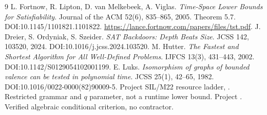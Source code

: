 \documentclass[10pt]{article}
\begin{document}
\begin{thebibliography}{9}
 L. Fortnow, R. Lipton, D. van Melkebeek, A. Viglas. \emph{Time-Space Lower Bounds for Satisfiability}. Journal of the ACM 52(6), 835--865, 2005. Theorem 5.7. DOI:10.1145/1101821.1101822. \url{https://lance.fortnow.com/papers/files/tst.pdf}.
 J. Dreier, S. Ordyniak, S. Szeider. \emph{SAT Backdoors: Depth Beats Size}. JCSS 142, 103520, 2024. DOI:10.1016/j.jcss.2024.103520.
 M. Hutter. \emph{The Fastest and Shortest Algorithm for All Well-Defined Problems}. IJFCS 13(3), 431--443, 2002. DOI:10.1142/S0129054102001199.
 E. Luks. \emph{Isomorphism of graphs of bounded valence can be tested in polynomial time}. JCSS 25(1), 42--65, 1982. DOI:10.1016/0022-0000(82)90009-5.
 Project SIL/M22 resource ladder, . Restricted grammar and $q$ parameter, not a runtime lower bound.
 Project . Verified algebraic conditional criterion, no contractor.
\end{thebibliography}
\end{document}
